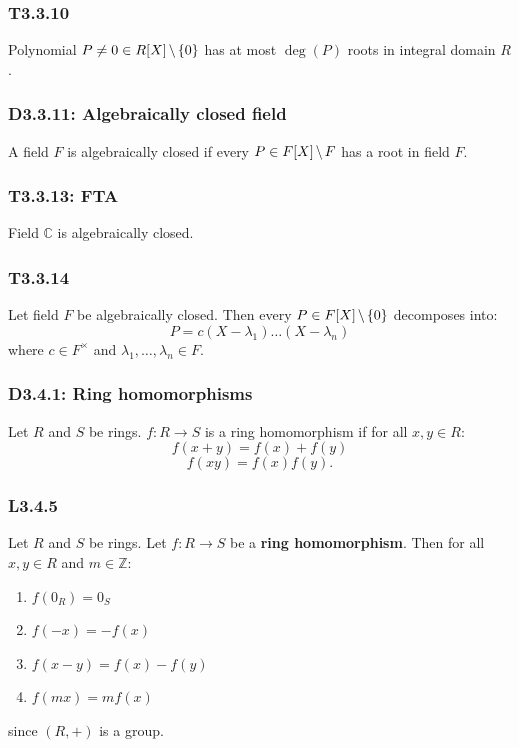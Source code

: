\documentclass{article}
\begin{document}
\begin{multicols*}{3}
\subsubsection*{T3.3.10}
Polynomial
$P\neq0\in R[X]\hspace{0.02in}\backslash\hspace{0.02in}\{0\}$
has at most $\deg(P)$ roots in integral domain $R$.

\subsubsection*{D3.3.11: Algebraically closed field}
A field $F$ is algebraically closed if every
$P\in F[X]\hspace{0.02in}\backslash\hspace{0.02in}F$
has a root in field $F$.

\subsubsection*{T3.3.13: FTA}
Field $\mathbb{C}$ is algebraically closed.

\subsubsection*{T3.3.14}
Let field $F$ be algebraically closed. Then every
$P\in F[X]\hspace{0.02in}\backslash\hspace{0.02in}\{0\}$
decomposes into:
$$P=c(X-\lambda_1)\dots(X-\lambda_n)$$
where $c\in F^{\times}$ and $\lambda_1,\dots,\lambda_n\in F$.

\subsubsection*{D3.4.1: Ring homomorphisms}
Let $R$ and $S$ be rings. $f:R\rightarrow S$ is a ring
homomorphism if for all $x,y\in R$:
$$f(x+y)=f(x)+f(y)$$
$$f(xy)=f(x)f(y).$$

\subsubsection*{L3.4.5}
Let $R$ and $S$ be rings. Let $f:R\rightarrow S$ be a
\textbf{ring homomorphism}.
Then for all $x,y\in R$ and $m\in\mathbb{Z}$:
\begin{enumerate}
    \item $f(0_R)=0_S$
    \item $f(-x)=-f(x)$
    \item $f(x-y)=f(x)-f(y)$
    \item $f(mx)=mf(x)$
\end{enumerate}
since $(R,+)$ is a group.


\end{multicols*}
\end{document}
